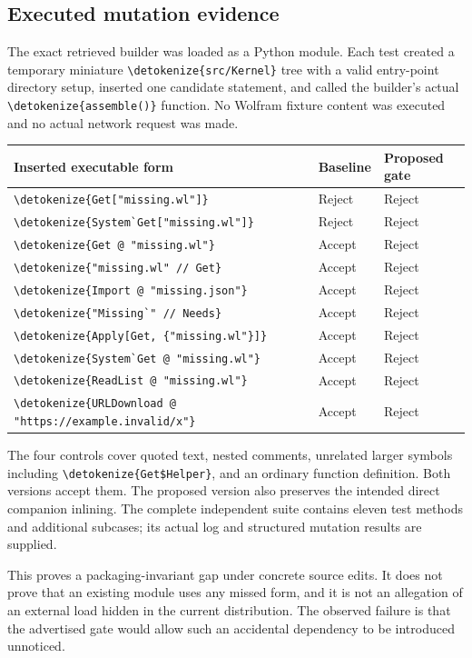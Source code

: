 \documentclass[11pt,a4paper]{article}
\newcommand{\wl}[1]{\texttt{\expandafter\nolinkurl\expandafter{\detokenize{#1}}}}
\begin{document}
\subsection{Executed mutation evidence}

The exact retrieved builder was loaded as a Python module. Each test created a
temporary miniature \wl{src/Kernel} tree with a valid entry-point directory setup,
inserted one candidate statement, and called the builder's actual
\wl{assemble()} function. No Wolfram fixture content was executed and no actual
network request was made.

\begin{longtable}{@{}p{}p{}p{}@{}}
\toprule
Inserted executable form & Baseline & Proposed gate\\
\midrule
\endhead
\wl{Get["missing.wl"]} & Reject & Reject\\
\wl{System`Get["missing.wl"]} & Reject & Reject\\
\wl{Get @ "missing.wl"} & Accept & Reject\\
\wl{"missing.wl" // Get} & Accept & Reject\\
\wl{Import @ "missing.json"} & Accept & Reject\\
\wl{"Missing`" // Needs} & Accept & Reject\\
\wl{Apply[Get, {"missing.wl"}]} & Accept & Reject\\
\wl{System`Get @ "missing.wl"} & Accept & Reject\\
\wl{ReadList @ "missing.wl"} & Accept & Reject\\
\wl{URLDownload @ "https://example.invalid/x"} & Accept & Reject\\
\bottomrule
\end{longtable}

The four controls cover quoted text, nested comments, unrelated larger symbols
including \wl{Get$Helper}, and an ordinary function definition. Both versions
accept them. The proposed version also preserves the intended direct companion
inlining. The complete independent suite contains eleven test methods and
additional subcases; its actual log and structured mutation results are supplied.

This proves a packaging-invariant gap under concrete source edits. It does not
prove that an existing module uses any missed form, and it is not an allegation
of an external load hidden in the current distribution. The observed failure is
that the advertised gate would allow such an accidental dependency to be
introduced unnoticed.
\end{document}
